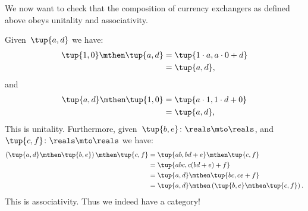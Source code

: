 We now want to check that the composition of currency exchangers as defined above obeys unitality and associativity.

Given~$\tup{a,d}$ we have:
\begin{equation*}
	\begin{aligned}
		\tup{1,0}\mthen\tup{a,d} & =\tup{1\cdot a, a\cdot 0+d} \\
		                         & =\tup{a,d},
	\end{aligned}
\end{equation*}
and
\begin{equation*}
	\begin{aligned}
		\tup{a,d}\mthen \tup{1,0} & =\tup{a\cdot 1, 1\cdot d+0} \\
		                          & =\tup{a,d},
	\end{aligned}
\end{equation*}
This is unitality.
Furthermore, given~$\tup{b,e}\colon \reals \mto \reals$, and~$\tup{c,f}\colon \reals \mto \reals$ we have:
\begin{equation*}
	\begin{aligned}
		\left( \tup{a,d}\mthen \tup{b,e}\right)\mthen \tup{c,f} & =\tup{ab,bd+e}\mthen \tup{c,f}                            \\
		                                                        & =\tup{abc,c(bd+e)+f}                                      \\
		                                                        & =\tup{a,d}\mthen \tup{bc,ce+f}                            \\
		                                                        & =\tup{a,d}\mthen \left( \tup{b,e}\mthen \tup{c,f}\right).
	\end{aligned}
\end{equation*}
This is associativity.
Thus we indeed have a category!



